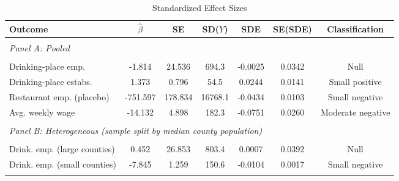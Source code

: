 \begin{table}[htbp]
\centering
\caption{Standardized Effect Sizes}
\label{tab:sde}
\footnotesize
\begin{adjustbox}{max width=\textwidth}
\begin{tabular}{lcccccc}
\hline\hline
Outcome & $\hat{\beta}$ & SE & SD($Y$) & SDE & SE(SDE) & Classification \\
\hline
\\[-1.8ex]
\multicolumn{7}{l}{\textit{Panel A: Pooled}} \\
\\[-1.8ex]
Drinking-place emp. & -1.814 & 24.536 & 694.3 & -0.0025 & 0.0342 & Null \\
Drinking-place estabs. & 1.373 & 0.796 & 54.5 & 0.0244 & 0.0141 & Small positive \\
Restaurant emp. (placebo) & -751.597 & 178.834 & 16768.1 & -0.0434 & 0.0103 & Small negative \\
Avg. weekly wage & -14.132 & 4.898 & 182.3 & -0.0751 & 0.0260 & Moderate negative \\
\\[-1.8ex]
\multicolumn{7}{l}{\textit{Panel B: Heterogeneous (sample split by median county population)}} \\
\\[-1.8ex]
Drink. emp. (large counties) & 0.452 & 26.853 & 803.4 & 0.0007 & 0.0392 & Null \\
Drink. emp. (small counties) & -7.845 & 1.259 & 150.6 & -0.0104 & 0.0017 & Small negative \\
\\[-1.8ex]
\hline\hline
\end{tabular}
\end{adjustbox}
\begin{tablenotes}
\small

\end{tablenotes}
\end{table}
